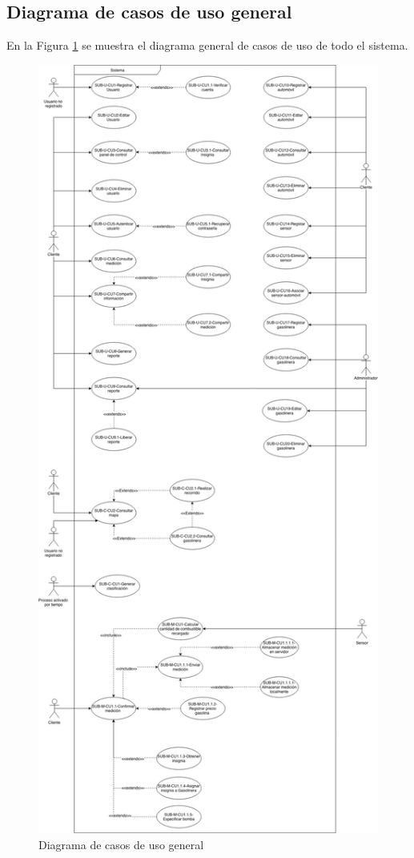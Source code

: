 \subsection{Diagrama de casos de uso general}
En la Figura \ref{fig:dcu-general} se muestra el diagrama general de casos de uso de todo el sistema.
\begin{figure}[H]
	\centering
	\includegraphics[scale=.198]{Capitulo4/software/submodulos/images/dcu}
	\caption{Diagrama de casos de uso general}
	\label{fig:dcu-general}
\end{figure}


